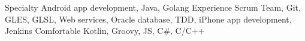 
\begin{cvskills}
	\cvskill
		{Specialty}
		{Android app development, Java, Golang}
	\cvskill
		{Experience}
		{Scrum Team, Git, GLES, GLSL, Web services, Oracle database, TDD, iPhone app development, Jenkins}
	\cvskill
		{Comfortable}
		{Kotlin, Groovy, JS, C\#, C/C++}
\end{cvskills}

